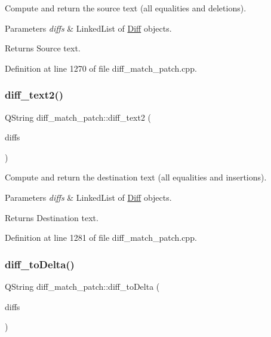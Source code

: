 Compute and return the source text (all equalities and deletions). 
\begin{DoxyParams}{Parameters}
{\em diffs} & Linked\+List of \hyperlink{class_diff}{Diff} objects. \\
\hline
\end{DoxyParams}
\begin{DoxyReturn}{Returns}
Source text. 
\end{DoxyReturn}


Definition at line 1270 of file diff\+\_\+match\+\_\+patch.\+cpp.

\mbox{\label{classdiff__match__patch_a9d3e1424496704a7e1d1f7995d465f20}} 
\subsubsection{\texorpdfstring{diff\+\_\+text2()}{diff\_text2()}}
{\footnotesize\ttfamily Q\+String diff\+\_\+match\+\_\+patch\+::diff\+\_\+text2 (\begin{DoxyParamCaption}\item[{const Q\+List$<$ \hyperlink{class_diff}{Diff} $>$ \&}]{diffs }\end{DoxyParamCaption})}

Compute and return the destination text (all equalities and insertions). 
\begin{DoxyParams}{Parameters}
{\em diffs} & Linked\+List of \hyperlink{class_diff}{Diff} objects. \\
\hline
\end{DoxyParams}
\begin{DoxyReturn}{Returns}
Destination text. 
\end{DoxyReturn}


Definition at line 1281 of file diff\+\_\+match\+\_\+patch.\+cpp.

\mbox{\label{classdiff__match__patch_acc6b4e2d43c1be99c291049810bfc654}} 
\subsubsection{\texorpdfstring{diff\+\_\+to\+Delta()}{diff\_toDelta()}}
{\footnotesize\ttfamily Q\+String diff\+\_\+match\+\_\+patch\+::diff\+\_\+to\+Delta (\begin{DoxyParamCaption}\item[{const Q\+List$<$ \hyperlink{class_diff}{Diff} $>$ \&}]{diffs }\end{DoxyParamCaption})}

